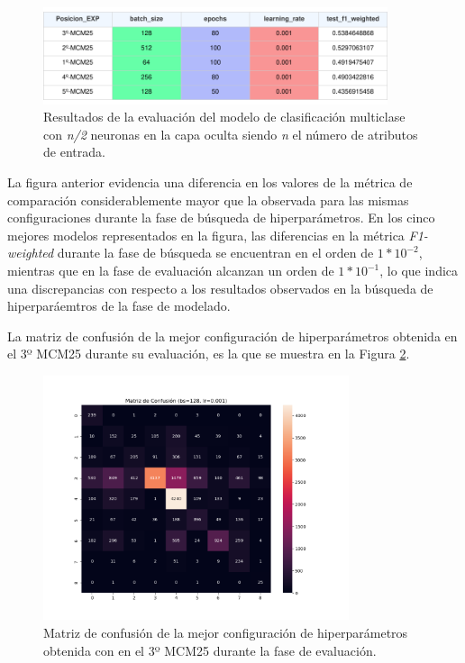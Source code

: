 \begin{figure}[H]
    \centering
    \includegraphics[width=0.9\textwidth]{./img/evaluacion/resultados/EVALMCM25.pdf}
    \caption{Resultados de la evaluación del modelo de clasificación multiclase con \textit{n/2} neuronas en la capa oculta siendo \textit{n} el número de atributos de entrada.}
    \label{fig:EVALMCM25}
\end{figure}

La figura anterior evidencia una diferencia en los valores de la métrica de comparación considerablemente mayor que la observada para las mismas configuraciones durante la fase de búsqueda de hiperparámetros. En los cinco mejores modelos representados en la figura, las diferencias en la métrica \textit{F1-weighted} durante la fase de búsqueda se encuentran en el orden de $1*10^{-2}$, mientras que en la fase de evaluación alcanzan un orden de $1*10^{-1}$, lo que indica una discrepancias con respecto a los resultados observados en la búsqueda de hiperparáemtros de la fase de modelado.

La matriz de confusión de la mejor configuración de hiperparámetros obtenida en el 3º MCM25 durante su evaluación, es la que se muestra en la Figura \ref{fig:MC_EVAL_MCM25}.

\begin{figure}[H]
    \centering
    \includegraphics[width=0.8\textwidth]{./img/evaluacion/matrices_confusion/MC_EVAL_MCM25.png}
    \caption{Matriz de confusión de la mejor configuración de hiperparámetros obtenida con en el 3º MCM25 durante la fase de evaluación.}
    \label{fig:MC_EVAL_MCM25}
\end{figure}

